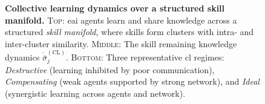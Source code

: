 \documentclass[12pt]{article}
\begin{document}
\begin{figure}[t!]

\caption{\label{fig:collective_learning_and_skill_manifold_conceptualization} 
	\textbf{Collective learning dynamics over a structured skill manifold.} 
	\textsc{Top}: \ac{eai} agents learn and share knowledge across a structured \textit{skill manifold}, where skills form clusters with intra- and inter-cluster similarity. \textsc{Middle}: The skill remaining knowledge dynamics $\dot{\bar{\sigma}}^{(\mathrm{CL})}_j$. \textsc{Bottom}: Three representative \ac{cl} regimes: \textit{Destructive} (learning inhibited by poor communication), \textit{Compensating} (weak agents supported by strong network), and \textit{Ideal} (synergistic learning across agents and network).
}
\end{figure}
\end{document}
